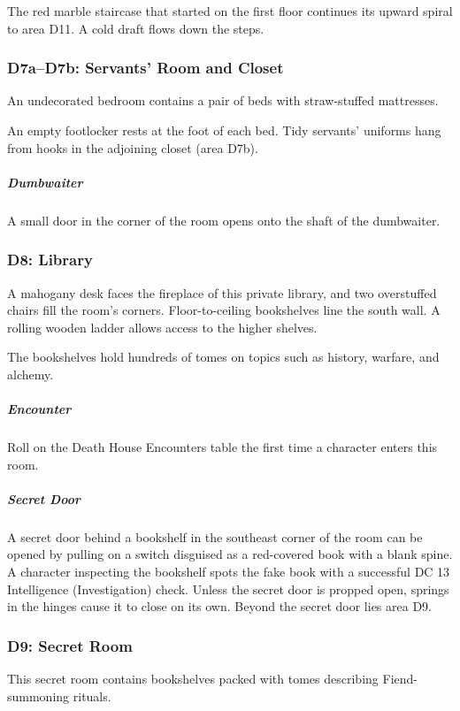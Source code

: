 \documentclass[10pt,a4paper,twoside,bg=print,twocolumn,openany,nodeprecatedcode]{dndbook}
\begin{document}
The red marble staircase that started on the first floor continues its upward spiral to area D11. A cold draft flows down the steps.

\subsubsection{D7a–D7b: Servants' Room and Closet}
\begin{DndReadAloud}{}
An undecorated bedroom contains a pair of beds with straw-stuffed mattresses.

\end{DndReadAloud}

An empty footlocker rests at the foot of each bed. Tidy servants' uniforms hang from hooks in the adjoining closet (area D7b).

\subparagraph{Dumbwaiter}
A small door in the corner of the room opens onto the shaft of the dumbwaiter.

\subsubsection{D8: Library}
\begin{DndReadAloud}{}
A mahogany desk faces the fireplace of this private library, and two overstuffed chairs fill the room's corners. Floor-to-ceiling bookshelves line the south wall. A rolling wooden ladder allows access to the higher shelves.

\end{DndReadAloud}

The bookshelves hold hundreds of tomes on topics such as history, warfare, and alchemy.

\subparagraph{Encounter}
Roll on the Death House Encounters table the first time a character enters this room.

\subparagraph{Secret Door}
A secret door behind a bookshelf in the southeast corner of the room can be opened by pulling on a switch disguised as a red-covered book with a blank spine. A character inspecting the bookshelf spots the fake book with a successful DC 13 Intelligence (Investigation) check. Unless the secret door is propped open, springs in the hinges cause it to close on its own. Beyond the secret door lies area D9.

\subsubsection{D9: Secret Room}
This secret room contains bookshelves packed with tomes describing Fiend-summoning rituals.
\end{document}
